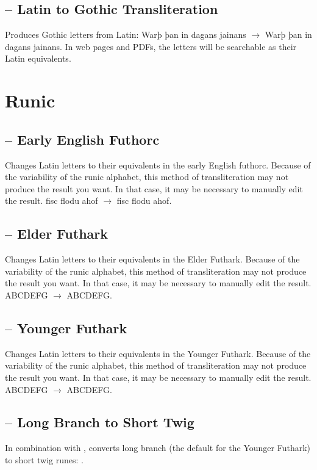 \subsection{ – Latin to Gothic Transliteration}
Produces Gothic letters from Latin: {Warþ þan in dagans jainans} $\rightarrow $
{\LatinToGothic{}Warþ þan in dagans
jainans}. In web pages and PDFs, the letters will be searchable as their Latin equivalents.

\section{Runic}
\subsection{ – Early English Futhorc}
Changes Latin letters to their equivalents in the early English futhorc. Because of the variability of the runic
alphabet, this method of transliteration may not produce the result you want. In that case, it may be necessary to
manually edit the result. fisc flodu ahof $\rightarrow $ {fisc flodu ahof}.

\subsection{ – Elder
Futhark}
Changes Latin letters to their equivalents in the Elder Futhark. Because of the variability of the runic alphabet, this
method of transliteration may not produce the result you want. In that case, it may be necessary to manually edit the
result. ABCDEFG $\rightarrow $ {ABCDEFG}.

\subsection{ – Younger
Futhark}
Changes Latin letters to their equivalents in the Younger Futhark. Because of the variability of the runic alphabet,
this method of transliteration may not produce the result you want. In that case, it may be necessary to manually edit
the result. ABCDEFG $\rightarrow $ {ABCDEFG}.

\subsection{ –
Long Branch to Short Twig}
In combination with , converts long branch (the default for the Younger Futhark) to short twig runes:
{}.

